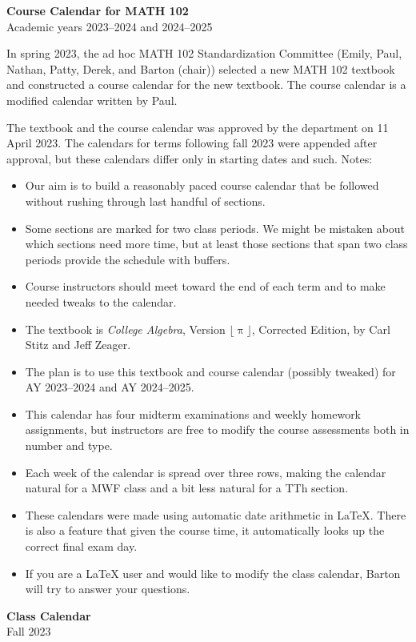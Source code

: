 \documentclass[11pt]{article} %
\newcounter{hw}\setcounter{hw}{0}
\newcounter{ex}\setcounter{ex}{0}
\newcounter{wk}\setcounter{wk}{0}
\newcommand{\calendarHead}[2]{%
  \setcounter{ex}{0}
  \setcounter{hw}{0}
  \setcounter{wk}{0}
  \large
   \begin{flushleft}
    \textbf{Class Calendar} \\
    #1 #2
  \end{flushleft}
  \normalsize}
\begin{document}
\begin{flushleft}
\large
\textbf{Course Calendar for MATH 102} \\
\normalsize
Academic years 2023--2024 and 2024--2025
\end{flushleft}

\noindent In spring 2023, the ad hoc MATH 102 Standardization Committee (Emily, Paul, Nathan, Patty, Derek,
and Barton (chair)) selected a new MATH 102 textbook and constructed a course calendar for the new textbook. The course 
calendar is a modified calendar written by Paul.

The textbook and the course calendar was approved by the department on 11 April 2023. 
The calendars for terms following fall 2023 were appended after approval,
but these calendars differ only in starting dates and such.  Notes:

\begin{itemize}

\item Our aim is to build a reasonably paced course calendar that
be followed without rushing through last handful of
sections. 

\item Some sections are marked for two class periods. We might be
mistaken about which sections need more time, but at least those
sections that span two class periods provide the schedule with
buffers. 

\item Course instructors should meet toward the end of each term 
and to make needed tweaks to the calendar.

\item The textbook is \emph{College Algebra}, Version $\lfloor \uppi \rfloor$,
Corrected Edition, by Carl Stitz and Jeff Zeager.

\item The plan is to use this textbook and  course calendar (possibly tweaked) 
for AY  2023--2024 and AY 2024--2025.

\item This calendar has four midterm examinations and weekly homework 
 assignments, but instructors are free to modify the course 
 assessments both in number and type.

\item Each week of the calendar is spread over three rows, making the calendar natural
 for a MWF class and a bit less natural for a TTh section.

\item These calendars were made using automatic date arithmetic in La\TeX.
There is also a feature that given the course time, it automatically
looks up the correct final exam day. 

\item If you are a La\TeX\/ user and would like to modify the class
calendar, Barton will try to answer your questions.


\end{itemize}
\vfill
\newpage
\SetDate[21/08/2023] 
\calendarHead{Fall}{2023}
\end{document}
